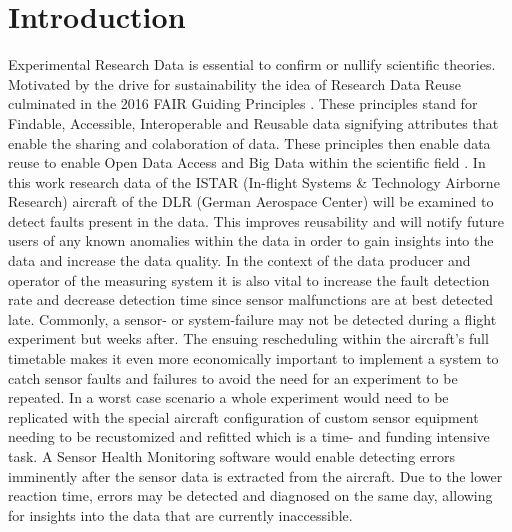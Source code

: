 
\chapter{Introduction \label{ch1-intro}}
Experimental Research Data is essential to confirm or nullify scientific theories. Motivated by the drive for sustainability the idea of Research Data Reuse culminated in the 2016 FAIR Guiding Principles \cite{wilkinson_fair_2016}. These principles stand for Findable, Accessible, Interoperable and Reusable data signifying attributes that enable the sharing and colaboration of data. These principles then enable data reuse to enable Open Data Access and Big Data within the scientific field \cite{hodson_fair_2018}. In this work research data of the ISTAR (In-flight Systems \& Technology Airborne Research) aircraft of the DLR (German Aerospace Center) will be examined to detect faults present in the data. This improves reusability and will notify future users of any known anomalies within the data in order to gain insights into the data and increase the data quality. In the context of the data producer and operator of the measuring system it is also vital to increase the fault detection rate and decrease detection time since sensor malfunctions are at best detected late. Commonly, a sensor- or system-failure may not be detected during a flight experiment but weeks after. The ensuing rescheduling within the aircraft's full timetable makes it even more economically important to implement a system to catch sensor faults and failures to avoid the need for an experiment to be repeated. In a worst case scenario a whole experiment would need to be replicated with the special aircraft configuration of custom sensor equipment needing to be recustomized and refitted which is a time- and funding intensive task.
A Sensor Health Monitoring software would enable detecting errors imminently after the sensor data is extracted from the aircraft. Due to the lower reaction time, errors may be detected and diagnosed on the same day, allowing for insights into the data that are currently inaccessible.

